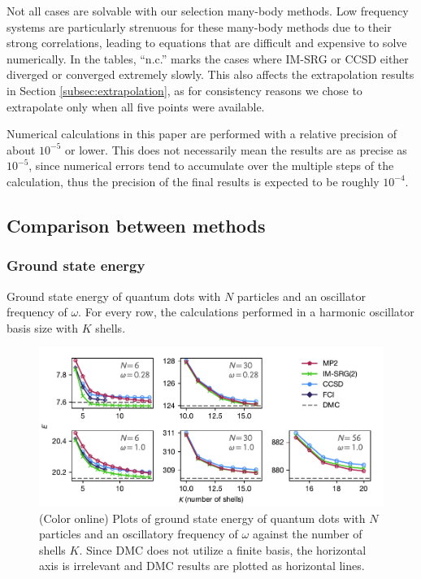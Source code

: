 Not all cases are solvable with our selection many-body methods.  Low frequency systems are particularly strenuous for these many-body methods due to their strong correlations, leading to equations that are difficult and expensive to solve numerically.  In the tables, ``n.c.'' marks the cases where IM-SRG or CCSD either diverged or converged extremely slowly.  This also affects the extrapolation results in Section \ref{subsec:extrapolation}, as for consistency reasons we chose to extrapolate only when all five points were available.

Numerical calculations in this paper are performed with a relative
precision of about $10^{-5}$ or lower.  This does not necessarily mean
the results are as precise as $10^{-5}$, since numerical errors tend
to accumulate over the multiple steps of the calculation, thus the
precision of the final results is expected to be roughly $10^{-4}$.

\subsection{Comparison between methods}

\subsubsection{Ground state energy}

\begin{table}
  \centering
  \caption{Ground state energy of quantum dots with $N$ particles and an oscillator frequency of $\omega$.  For every row, the calculations performed in a harmonic oscillator basis size with $K$ shells.}
  \label{tab:ground}
  
\end{table}

\begin{figure}
  \centering
  \includegraphics{fig-gs2.pdf}
  \caption{(Color online) Plots of ground state energy of quantum dots with $N$ particles and an oscillatory frequency of $\omega$ against the number of shells $K$.  Since DMC does not utilize a finite basis, the horizontal axis is irrelevant and DMC results are plotted as horizontal lines.}
  \label{fig:gs}
\end{figure}

